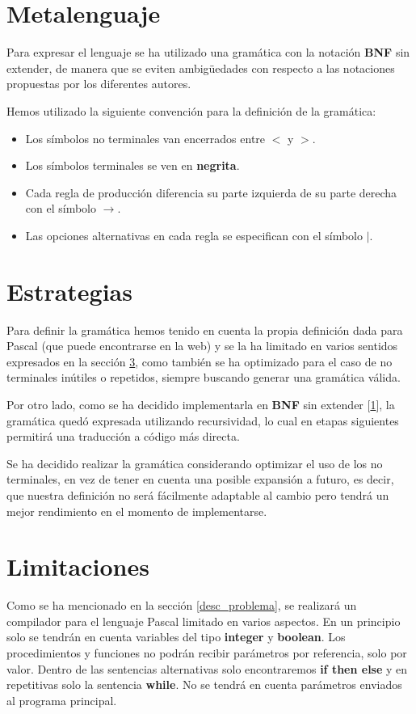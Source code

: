 \section{Metalenguaje}
\label{metalenguaje}
Para expresar el lenguaje se ha utilizado una gramática con la notación \textbf{BNF} sin extender, de manera que se eviten ambigüedades con respecto a las notaciones propuestas por los diferentes autores.

Hemos utilizado la siguiente convención para la definición de la gramática:

\begin{itemize}
\item Los símbolos no terminales van encerrados entre $<$ y $>$.
\item Los símbolos terminales se ven en \textbf{negrita}.
\item Cada regla de producción diferencia su parte izquierda de su parte derecha con el símbolo $\rightarrow$.
\item Las opciones alternativas en cada regla se especifican con el símbolo $|$.
\end{itemize}

\section{Estrategias}
\label{estrategias}
Para definir la gramática hemos tenido en cuenta la propia definición dada para Pascal (que puede encontrarse en la web) y se la ha limitado en varios sentidos expresados en la sección \ref{limitaciones}, como también se ha optimizado para el caso de no terminales inútiles o repetidos, siempre buscando generar una gramática válida.

Por otro lado, como se ha decidido implementarla en \textbf{BNF} sin extender [\ref{metalenguaje}], la gramática quedó expresada utilizando recursividad, lo cual en etapas siguientes permitirá una traducción a código más directa.

Se ha decidido realizar la gramática considerando optimizar el uso de los no terminales, en vez de tener en cuenta una posible expansión a futuro, es decir, que nuestra definición no será fácilmente adaptable al cambio pero tendrá un mejor rendimiento en el momento de implementarse.

\section{Limitaciones}
\label{limitaciones}
Como se ha mencionado en la sección \ref{desc_problema}, se realizará un compilador para el lenguaje Pascal limitado en varios aspectos. En un principio solo se tendrán en cuenta variables del tipo \textbf{integer} y \textbf{boolean}. Los procedimientos y funciones no podrán recibir parámetros por referencia, solo por valor. Dentro de las sentencias alternativas solo encontraremos \textbf{if then else} y en repetitivas solo la sentencia \textbf{while}. No se tendrá en cuenta parámetros enviados al programa principal. %

